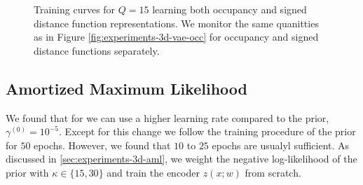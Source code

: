 \begin{figure}
\begin{subfigure}[t]{0.31\textwidth}
  \end{subfigure}
  
  \caption{Training curves for $Q = 15$ learning both
  occupancy and signed distance function representations. We monitor the
  same quanitties as in Figure \ref{fig:experiments-3d-vae-occ}
  for occupancy and signed distance functions separately.}
  \label{fig:appendix-experiments-3d-occ-sdf-15}
\end{figure}

\subsection{Amortized Maximum Likelihood}
\label{sec:appendix-experiments-3d-aml}

We found that for \AML we can use a higher learning rate compared to the
\VAE prior, \ie $\gamma^{(0)} = 10^{-5}$. Except for this change we follow
the training procedure of the prior for $50$ epochs. However, we found that
$10$ to $25$ epochs are usualyl sufficient. As discussed in 
\ref{sec:experiments-3d-aml}, we weight the negative log-likelihood
of the prior with $\kappa \in \{15, 30\}$ and train the encoder $z(x ;w)$
from scratch.


